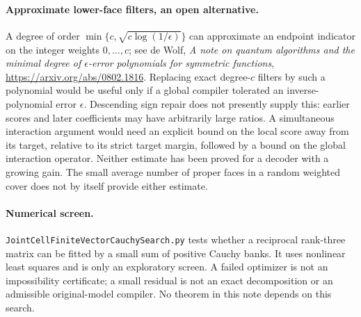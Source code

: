 \documentclass{article}
\begin{document}
\paragraph{Approximate lower-face filters, an open alternative.}
A degree of order $\min\{c,\sqrt{c\log(1/\epsilon)}\}$ can approximate
an endpoint indicator on the integer weights $0,\ldots,c$; see de Wolf,
\emph{A note on quantum algorithms and the minimal degree of
$\epsilon$-error polynomials for symmetric functions},
\url{https://arxiv.org/abs/0802.1816}.
Replacing exact degree-$c$
filters by such a polynomial would be useful only if a global compiler
tolerated an inverse-polynomial error $\epsilon$. Descending sign repair
does not presently supply this: earlier scores and later coefficients
may have arbitrarily large ratios. A simultaneous interaction argument
would need an explicit bound on the local score away from its target,
relative to its strict target margin, followed by a bound on the global
interaction operator. Neither estimate has been proved for a decoder
with a growing gain. The small average number of proper faces in a
random weighted cover does not by itself provide either estimate.

\paragraph{Numerical screen.}
\texttt{JointCellFiniteVectorCauchySearch.py} tests whether a reciprocal
rank-three matrix can be fitted by a small sum of positive Cauchy banks.
It uses nonlinear least squares and is only an exploratory screen.
A failed optimizer is not an impossibility certificate; a small residual
is not an exact decomposition or an admissible original-model compiler.
No theorem in this note depends on this search.
\end{document}
